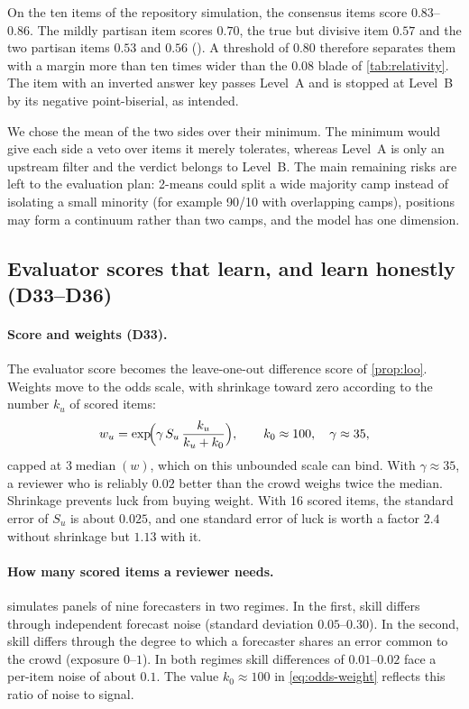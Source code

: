 On the ten items of the repository simulation, the consensus items score $0.83$--$0.86$. The
mildly partisan item scores $0.70$, the true but divisive item $0.57$ and the two partisan items
$0.53$ and $0.56$ (). A threshold of $0.80$ therefore
separates them with a margin more than ten times wider than the $0.08$ blade of
\cref{tab:relativity}. The item with an inverted answer key passes Level~A and is stopped at
Level~B by its negative point-biserial, as intended.

We chose the mean of the two sides over their minimum. The minimum would give each side a veto
over items it merely tolerates, whereas Level~A is only an upstream filter and the verdict belongs
to Level~B. The main remaining risks are left to the evaluation plan: 2-means could split a wide
majority camp instead of isolating a small minority (for example 90/10 with overlapping camps),
positions may form a continuum rather than two camps, and the model has one dimension.

\subsection{Evaluator scores that learn, and learn honestly (D33--D36)}

\paragraph{Score and weights (D33).} The evaluator score becomes the leave-one-out difference
score of \cref{prop:loo}. Weights move to the odds scale, with shrinkage toward zero according to
the number $k_u$ of scored items:
\begin{equation}\label{eq:odds-weight}
  w_u=\exp\!\Bigl(\gamma\,S_u\,\frac{k_u}{k_u+k_0}\Bigr),\qquad k_0\approx100,\quad\gamma\approx35,
\end{equation}
capped at $3\operatorname{median}(w)$, which on this unbounded scale can bind. With
$\gamma\approx35$, a reviewer who is reliably $0.02$ better than the crowd weighs twice the median.
Shrinkage prevents luck from buying weight. With 16 scored items, the standard error of $S_u$ is
about $0.025$, and one standard error of luck is worth a factor $2.4$ without shrinkage but $1.13$
with it.

\paragraph{How many scored items a reviewer needs.}  simulates panels of
nine forecasters in two regimes. In the first, skill differs through independent forecast noise
(standard deviation $0.05$--$0.30$). In the second, skill differs through the degree to which a
forecaster shares an error common to the crowd (exposure $0$--$1$). In both regimes skill
differences of $0.01$--$0.02$ face a per-item noise of about $0.1$. The value $k_0\approx100$ in
\eqref{eq:odds-weight} reflects this ratio of noise to signal.

